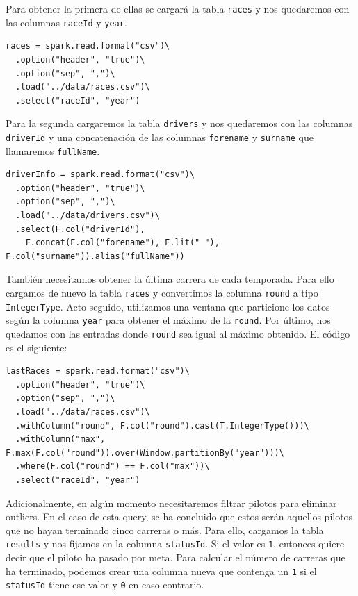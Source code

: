 \documentclass[12pt,twoside,titlepage]{report}
\begin{document}
Para obtener la primera de ellas se cargará la tabla \texttt{races} y nos quedaremos con las columnas \texttt{raceId} y \texttt{year}. 

\begin{lstlisting}
races = spark.read.format("csv")\
  .option("header", "true")\
  .option("sep", ",")\
  .load("../data/races.csv")\
  .select("raceId", "year")
\end{lstlisting}

Para la segunda cargaremos la tabla \texttt{drivers} y nos quedaremos con las columnas \texttt{driverId} y una concatenación de las columnas \texttt{forename} y \texttt{surname} que llamaremos \texttt{fullName}.

\begin{lstlisting}
driverInfo = spark.read.format("csv")\
  .option("header", "true")\
  .option("sep", ",")\
  .load("../data/drivers.csv")\
  .select(F.col("driverId"),
    F.concat(F.col("forename"), F.lit(" "), F.col("surname")).alias("fullName"))
\end{lstlisting}

También necesitamos obtener la última carrera de cada temporada. Para ello cargamos de nuevo la tabla \texttt{races} y convertimos la columna \texttt{round} a tipo \texttt{IntegerType}. Acto seguido, utilizamos una ventana que particione los datos según la columna \texttt{year} para obtener el máximo de la \texttt{round}. Por último, nos quedamos con las entradas donde \texttt{round} sea igual al máximo obtenido. El código es el siguiente:

\begin{lstlisting}
lastRaces = spark.read.format("csv")\
  .option("header", "true")\
  .option("sep", ",")\
  .load("../data/races.csv")\
  .withColumn("round", F.col("round").cast(T.IntegerType()))\
  .withColumn("max", F.max(F.col("round")).over(Window.partitionBy("year")))\
  .where(F.col("round") == F.col("max"))\
  .select("raceId", "year")
\end{lstlisting}


Adicionalmente, en algún momento necesitaremos filtrar pilotos para eliminar outliers. En el caso de esta query, se ha concluido que estos serán aquellos pilotos que no hayan terminado cinco carreras o más. Para ello, cargamos la tabla \texttt{results} y nos fijamos en la columna \texttt{statusId}. Si el valor es \texttt{1}, entonces quiere decir que el piloto ha pasado por meta. Para calcular el número de carreras que ha terminado, podemos crear una columna nueva que contenga un \texttt{1} si el \texttt{statusId} tiene ese valor y \texttt{0} en caso contrario.
\end{document}
